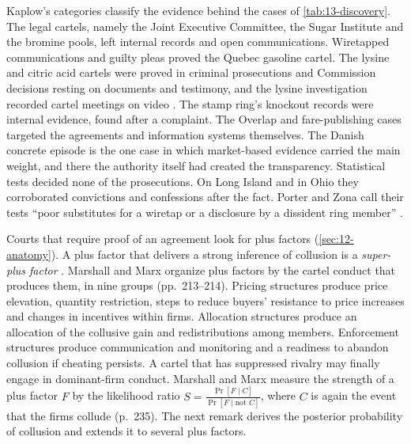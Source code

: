 Kaplow's categories classify the evidence behind the cases of \cref{tab:13-discovery}. The legal cartels, namely the
Joint Executive Committee, the Sugar Institute and the bromine pools, left internal records and open communications.
Wiretapped communications and guilty pleas proved the Quebec gasoline cartel. The lysine and citric acid cartels
were proved in criminal prosecutions and Commission decisions resting on documents and testimony, and the lysine
investigation recorded cartel meetings on video \citep[p.~197, note~46]{AskerNocke2021}. The stamp ring's knockout
records were internal evidence, found after a complaint. The Overlap and fare-publishing cases targeted the
agreements and information systems themselves. The Danish concrete episode is the one case in which market-based
evidence carried the main weight, and there the authority itself had created the transparency. Statistical tests
decided none of the prosecutions. On Long Island and in Ohio they corroborated convictions and confessions after
the fact. Porter and Zona call their tests ``poor substitutes for a wiretap or a disclosure by a dissident ring
member'' \citep[p.~210, note~78]{AskerNocke2021}.

Courts that require proof of an agreement look for plus factors (\cref{sec:12-anatomy}). A plus factor that
delivers a strong inference of collusion is a \emph{super-plus factor} \citep[p.~213]{MarshallMarx2012}. Marshall
and Marx organize plus factors by the cartel conduct that produces them, in nine groups (pp.~213--214). Pricing
structures produce price elevation, quantity restriction, steps to reduce buyers' resistance to price increases and
changes in incentives within firms. Allocation structures produce an allocation of the collusive gain and
redistributions among members. Enforcement structures produce communication and monitoring and a readiness to
abandon collusion if cheating persists. A cartel that has suppressed rivalry may finally engage in dominant-firm
conduct. Marshall and Marx measure the strength of a plus factor $F$ by the likelihood ratio
$S = \frac{\Pr[F \mid C]}{\Pr[F \mid \text{not } C]}$, where $C$ is again the event that the firms collude (p.~235). The
next remark derives the posterior probability of collusion and extends it to several plus factors.

